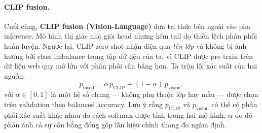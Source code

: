 \paragraph{CLIP fusion.}
Cuối cùng, \textbf{CLIP fusion (Vision-Language)} đưa tri thức bên ngoài vào pha inference.
Mô hình thị giác nhỏ giỏi head nhưng kém tail do thiên lệch phân phối huấn luyện.
Ngược lại, CLIP zero-shot nhận diện qua \emph{tên lớp} và không bị ảnh hưởng bởi
class imbalance trong tập dữ liệu của ta, vì CLIP được pre-train trên dữ liệu web
quy mô lớn với phân phối cân bằng hơn.
Ta trộn lồi xác suất của hai nguồn:
\begin{equation}
    p_{\text{fused}} = \alpha\,p_{\text{CLIP}} + (1 - \alpha)\,p_{\text{vision}},
    \label{eq:clip-fusion}
\end{equation}
với $\alpha \in [0, 1]$ là một hệ số chung --- không phụ thuộc lớp hay mẫu ---
được chọn trên validation theo balanced accuracy.
Lưu ý rằng $p_{\text{CLIP}}$ và $p_{\text{vision}}$ có thể có phân phối
xác suất khác nhau do cách softmax được tính trong hai mô hình;
$\alpha$ do đó phản ánh cả sự cân bằng đóng góp lẫn hiệu chỉnh thang đo ngầm định.



